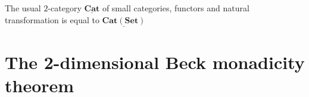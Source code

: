 \documentclass[a4paper,UKenglish,cleveref,pdftex,thm-restate,numberwithinsect]{lipics-v2021}
\newcommand{\cat}[1]{\ensuremath{\mathbf{#1}}}
\newcommand{\dcate}[1]{\underline{\mathbf{Cat}(\cat{#1})}}
\newcommand{\dcateg}{\mathbf{\underline{Cat}}}
\begin{document}
\begin{remark}\label{rem:set}
	The usual $2$-category $\dcateg$ of small categories, functors and natural transformation  is equal to $\dcate{Set}$
\end{remark}
	
	\section{The 2-dimensional Beck monadicity theorem}
	
\end{document}
